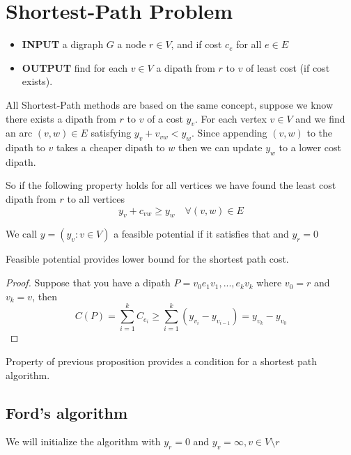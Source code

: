 	\chapter{Shortest-Path Problem}
		\begin{itemize}
			\item \textbf{INPUT} a digraph $G$ a node $r \in V$, and if cost $c_e$ for all $e\in E$
			\item \textbf{OUTPUT} find for each $v\in V$ a dipath from $r$ to $v$ of least cost (if cost exists).
		\end{itemize}

		All Shortest-Path methods are based on the same concept, suppose we know there exists a dipath from $r$ to $v$ of a cost $y_v$. For each vertex $v \in V$ and we find an arc $(v, w) \in E$ satisfying $y_v + v_{vw} < y_w$. Since appending $(v, w)$ to the dipath to $v$ takes a cheaper dipath to $w$ then we can update $y_w$ to a lower cost dipath.

		So if the following property holds for all vertices we have found the least cost dipath from $r$ to all vertices
		\begin{equation}
			y_v + c_{vw} \ge y_w \quad \forall (v, w) \in E
		\end{equation}
			
		We call $y = (y_v: v\in V)$ a feasible potential if it satisfies that and $y_r = 0$

		\begin{proposition}
			Feasible potential provides lower bound for the shortest path cost.
		\end{proposition}

		\begin{proof}
			Suppose that you have a dipath $P = v_0e_1v_1,...,e_kv_k$ where $v_0 = r$ and $v_k = v$, then
			\begin{equation}
				C(P) = \sum_{i=1}^k C_{e_i} \ge \sum_{i=1}^k(y_{v_i} - y_{v_{i-1}}) = y_{v_k} - y_{v_0}
			\end{equation}
		\end{proof}

		Property of previous proposition provides a condition for a shortest path algorithm.

		\section{Ford's algorithm}
			We will initialize the algorithm with $y_r = 0$ and $y_v = \infty, v\in V\setminus r$

